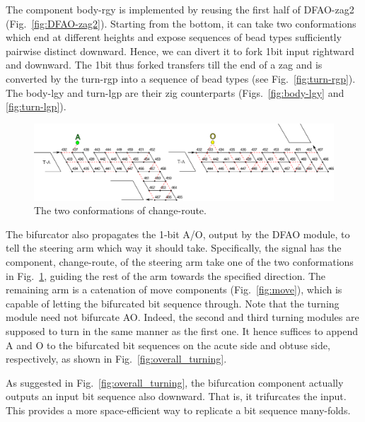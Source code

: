 The component body-rgy is implemented by reusing the first half of DFAO-zag2 (Fig.~\ref{fig:DFAO-zag2}). 
Starting from the bottom, it can take two conformations which end at different heights and expose sequences of bead types sufficiently pairwise distinct downward. 
Hence, we can divert it to fork 1bit input rightward and downward. 
The 1bit thus forked transfers till the end of a zag and is converted by the turn-rgp into a sequence of bead types (see Fig.~\ref{fig:turn-rgp}). 
The body-lgy and turn-lgp are their zig counterparts (Figs.~\ref{fig:body-lgy} and \ref{fig:turn-lgp}). 


\begin{figure}[h]
\centering
\includegraphics[width=\linewidth]{pic/change-route.png}
\caption{The two conformations of change-route.}
\label{fig:change_route}
\end{figure}

The bifurcator also propagates the 1-bit A/O, output by the DFAO module, to tell the steering arm which way it should take.
Specifically, the signal has the component, change-route, of the steering arm take one of the two conformations in Fig.~\ref{fig:change_route}, guiding the rest of the arm towards the specified direction.
The remaining arm is a catenation of move components (Fig.~\ref{fig:move}), which is capable of letting the bifurcated bit sequence through.  
Note that the turning module need not bifurcate AO.
Indeed, the second and third turning modules are supposed to turn in the same manner as the first one.
It hence suffices to append A and O to the bifurcated bit sequences on the acute side and obtuse side, respectively, as shown in Fig.~\ref{fig:overall_turning}.

\begin{remark}
As suggested in Fig.~\ref{fig:overall_turning}, the bifurcation component actually outputs an input bit sequence also downward.
That is, it trifurcates the input.
This provides a more space-efficient way to replicate a bit sequence many-folds.
\end{remark}

